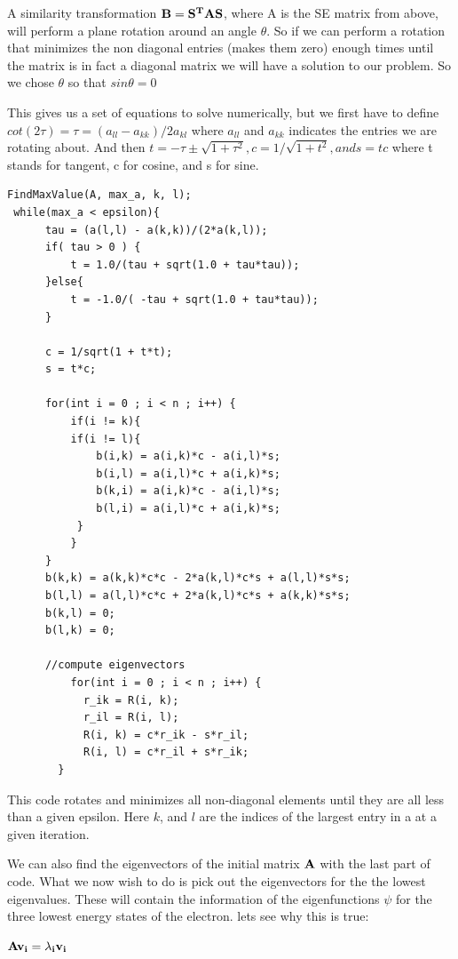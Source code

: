 \documentclass[norsk,a4paper,12pt]{article}
\begin{document}
A similarity transformation $\bf B = \bf{S^T}\bf{A}\bf{S}$, where A is the SE matrix from above, will perform a plane rotation around
an angle $\theta$. So if we can perform a rotation that minimizes the non diagonal entries (makes them zero) enough times until  
the matrix is in fact a diagonal matrix we will have a solution to our problem. So we chose $\theta$ so that $sin\theta = 0$

This gives us a set of equations to solve numerically, but we first have to define $cot(2\tau) = \tau = (a_{ll} - a_{kk})/2a_{kl}$ where 
$a_{ll}$ and $a_{kk}$ indicates the entries we are rotating about. And then $t = -\tau\pm\sqrt{1+\tau^2}, c = 1/\sqrt{1+t^2}, and s = tc$  
where t stands for tangent, c for cosine, and s for sine.


\begin{lstlisting}[frame=single]
 FindMaxValue(A, max_a, k, l);
 while(max_a < epsilon){
      tau = (a(l,l) - a(k,k))/(2*a(k,l));
	  if( tau > 0 ) {
	      t = 1.0/(tau + sqrt(1.0 + tau*tau));
	  }else{
	      t = -1.0/( -tau + sqrt(1.0 + tau*tau));
	  }
  
	  c = 1/sqrt(1 + t*t);
	  s = t*c;

	  for(int i = 0 ; i < n ; i++) {
	      if(i != k){
		  if(i != l){
		      b(i,k) = a(i,k)*c - a(i,l)*s;
		      b(i,l) = a(i,l)*c + a(i,k)*s;
		      b(k,i) = a(i,k)*c - a(i,l)*s;
		      b(l,i) = a(i,l)*c + a(i,k)*s;
		   }
	      }
	  }
	  b(k,k) = a(k,k)*c*c - 2*a(k,l)*c*s + a(l,l)*s*s;
	  b(l,l) = a(l,l)*c*c + 2*a(k,l)*c*s + a(k,k)*s*s;
	  b(k,l) = 0;
	  b(l,k) = 0;
	  
	  //compute eigenvectors
          for(int i = 0 ; i < n ; i++) {
            r_ik = R(i, k);
            r_il = R(i, l);
            R(i, k) = c*r_ik - s*r_il;
            R(i, l) = c*r_il + s*r_ik;
        }
\end{lstlisting}

This code rotates and minimizes all non-diagonal elements until they are all less than a given epsilon. Here $k$, and $l$
are the indices of the largest entry in a at a given iteration.

We can also find the eigenvectors of the initial matrix $\bf A$ with the last part of code. What we now wish to do is pick out the 
eigenvectors for the the lowest eigenvalues. These will contain the information of the eigenfunctions $\psi$ for the three lowest energy
states of the electron. lets see why this is true:

$\bf A v_i = \lambda_i v_i$
\end{document}
